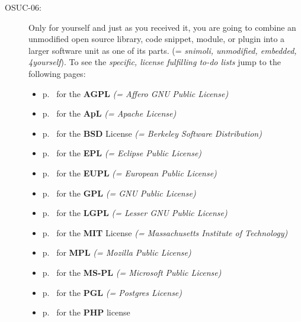 \begin{description}
\item[OSUC-06:]\label{OSUC-06-DEF} Only for yourself and just as you received
it, you are going to combine an unmodified open source library, code snippet,
module, or plugin into a larger software unit as one of its parts. (=
\textit{snimoli, unmodified, embedded, 4yourself}).
To see the \textit{specific, license fulfilling to-do lists} jump to the
following pages:
   \begin{itemize}
    \item p.\ \pageref{OSUC-06-AGPL} for the \textbf{AGPL}
      \textit{(= Affero GNU Public License)} 
    \item p.\ \pageref{OSUC-06-Apache20} for the \textbf{ApL}
      \textit{(= Apache License)}
    \item p.\ \pageref{OSUC-06-BSD} for the \textbf{BSD} License
      \textit{(= Berkeley Software Distribution)}
    \item p.\ \pageref{OSUC-06-EPL} for the \textbf{EPL}
      \textit{(= Eclipse Public License)}     
    \item p.\ \pageref{OSUC-06-EUPL} for the \textbf{EUPL}
      \textit{(= European Public License)} 
    \item p.\ \pageref{OSUC-06-GPL} for the \textbf{GPL}
       \textit{(= GNU Public License)} 
    \item p.\ \pageref{OSUC-06-LGPL} for the \textbf{LGPL}
      \textit{(= Lesser GNU Public License)}           
    \item p.\ \pageref{OSUC-06-MIT} for the \textbf{MIT} License
       \textit{(= Massachusetts Institute of Technology)} 
    \item p.\ \pageref{OSUC-06-MPL} for \textbf{MPL}
      \textit{(= Mozilla Public License)}     
    \item p.\ \pageref{OSUC-06-MS-PL} for the \textbf{MS-PL}
      \textit{(= Microsoft Public License)} 
    \item p.\ \pageref{OSUC-06-PGL} for the \textbf{PGL}
      \textit{(= Postgres License)} 
    \item p.\ \pageref{OSUC-06-PHP} for the \textbf{PHP} license 
  \end{itemize}


\end{description}
